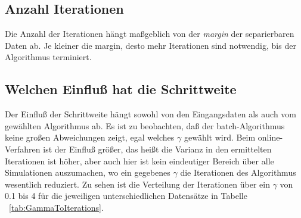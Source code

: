 \documentclass[]{report}
\begin{document}
\subsection{Anzahl Iterationen}

Die Anzahl der Iterationen h\"angt ma{\ss}geblich von der \emph{margin} der separierbaren Daten ab. Je kleiner die margin, desto mehr Iterationen sind notwendig, bis der Algorithmus terminiert.


\subsection{Welchen Einflu{\ss} hat die Schrittweite}

Der Einflu{\ss} der Schrittweite h\"angt sowohl von den Eingangsdaten als auch vom gew\"ahlten Algorithmus ab.
Es ist zu beobachten, da{\ss} der batch-Algorithmus keine gro{\ss}en Abweichungen zeigt, egal welches $\gamma$ gew\"ahlt wird. Beim online-Verfahren ist der Einflu{\ss} gr\"o{\ss}er, das hei{\ss}t die Varianz in den ermittelten Iterationen ist h\"oher, aber auch hier ist kein eindeutiger Bereich \"uber alle Simulationen auszumachen, wo ein gegebenes $\gamma$ die Iterationen des Algorithmus wesentlich reduziert. Zu sehen ist die Verteilung der Iterationen \"uber ein $\gamma$ von 0.1 bis 4 f\"ur die jeweiligen unterschiedlichen Datens\"atze in Tabelle ~\ref{tab:GammaToIterations}.
\end{document}
